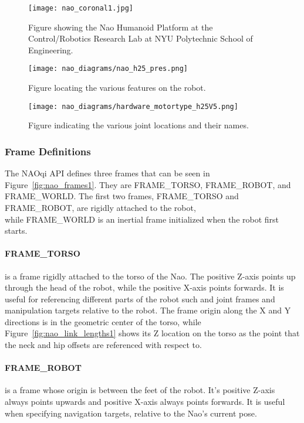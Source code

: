 \begin{figure}
\centering
\texttt{[image: nao\_coronal1.jpg]}
\caption{Figure showing the Nao Humanoid Platform at the Control/Robotics
         Research Lab at NYU Polytechnic School of Engineering.}
\label{fig:crrl_nao_coronal1}
\end{figure}

\begin{figure}
\centering
\texttt{[image: nao\_diagrams/nao\_h25\_pres.png]}
\caption{Figure locating the various features on the robot.}
\label{fig:nao_features1}
\end{figure}

\begin{figure}
\centering
\texttt{[image: nao\_diagrams/hardware\_motortype\_h25V5.png]}
\caption{Figure indicating the various joint locations and their names.}
\label{fig:nao_joints1}
\end{figure}

\FloatBarrier

\subsubsection{Frame Definitions}
The NAOqi API defines three frames that can be seen in Figure~\ref{fig:nao_frames1}.
They are FRAME\_TORSO, FRAME\_ROBOT, and FRAME\_WORLD\@.
The first two frames, FRAME\_TORSO and FRAME\_ROBOT, are rigidly attached to the robot, \\
while FRAME\_WORLD is an inertial frame initialized
when the robot first starts.

\paragraph{FRAME\_TORSO} 
is a frame rigidly attached to the torso of the Nao. The positive Z-axis points
up through the head of the robot, while the positive X-axis points forwards.
It is useful for referencing different parts of the robot such and joint frames
and manipulation targets relative to the robot.
The frame origin along the X and Y directions is in the geometric center
of the torso, while Figure~\ref{fig:nao_link_lengths1} shows its Z location on
the torso as the point that the neck and hip offsets are referenced with
respect to.

\paragraph{FRAME\_ROBOT}
is a frame whose origin is between the feet of the robot. It's positive Z-axis
always points upwards and positive X-axis always points forwards. It is useful
when specifying navigation targets, relative to the Nao's current pose.

